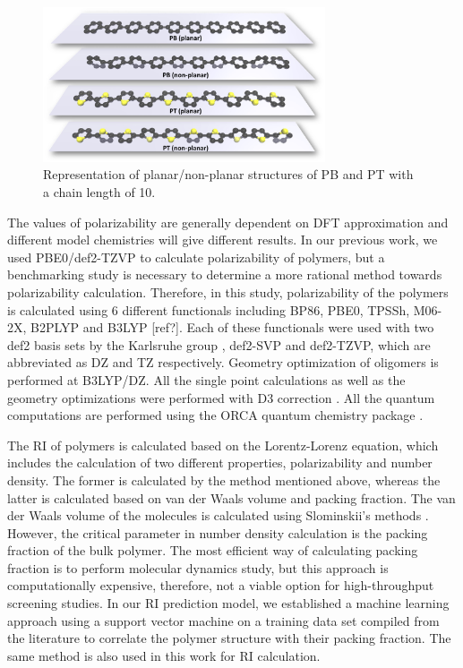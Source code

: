 \begin{figure}[htbp] 
	\centering
	\includegraphics[width=0.744\textwidth]{Chapter-3/Figures/PB_PT_structure.eps}
	\caption{Representation of planar/non-planar structures of PB and PT with a chain length of 10.} 
	\label{fig:PB_PT_structure} 
\end{figure}  


The values of polarizability are generally dependent on DFT approximation and different model chemistries will give different results. In our previous work, we used PBE0/def2-TZVP to calculate polarizability of polymers, but a benchmarking study is necessary to determine a more rational method towards polarizability calculation. Therefore, in this study, polarizability of the polymers is calculated using 6 different functionals including BP86, PBE0, TPSSh, M06-2X, B2PLYP and B3LYP [ref?]. Each of these functionals were used with two def2 basis sets by the Karlsruhe group \cite{Weigend2005}, def2-SVP and def2-TZVP, which are abbreviated as DZ and TZ respectively. Geometry optimization of oligomers is performed at B3LYP/DZ. All the single point calculations as well as the geometry optimizations were performed with D3 correction \cite{Grimme2010}. All the quantum computations are performed using the ORCA quantum chemistry package \cite{Neese2012}.

The RI of polymers is calculated based on the Lorentz-Lorenz equation, which includes the calculation of two different properties, polarizability and number density. The former is calculated by the method mentioned above, whereas the latter is calculated based on van der Waals volume and packing fraction. The van der Waals volume of the molecules is calculated using Slominskii's methods \cite{Slonimskii1970}. However, the critical parameter in number density calculation is the packing fraction of the bulk polymer. The most efficient way of calculating packing fraction is to perform molecular dynamics study, but this approach is computationally expensive, therefore, not a viable option for high-throughput screening studies. In our RI prediction model, we established a machine learning approach using a support vector machine on a training data set compiled from the literature to correlate the polymer structure with their packing fraction. The same method is also used in this work for RI calculation.

